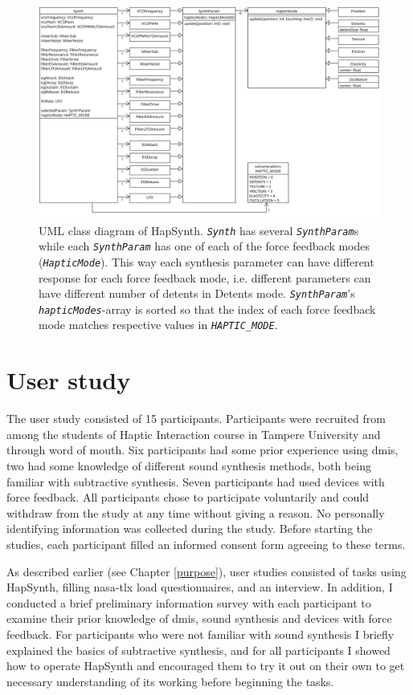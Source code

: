 \begin{figure}[h]
	\centering
	\includegraphics[width=1.0\linewidth]{figures/class-diagram.png}
	\caption{UML class diagram of HapSynth. \emph{\texttt{Synth}} has several \emph{\texttt{SynthParam}}s while each \emph{\texttt{SynthParam}} has one of each of the force feedback modes (\emph{\texttt{HapticMode}}). This way each synthesis parameter can have different response for each force feedback mode, i.e. different parameters can have different number of detents in Detents mode. \emph{\texttt{SynthParam}}'s \emph{\texttt{hapticModes}}-array is sorted so that the index of each force feedback mode matches respective values in \emph{\texttt{HAPTIC\_MODE}}.}
	\label{classdiagram}
\end{figure}

\section{User study} \label{userstudy}

The user study consisted of 15 participants. Participants were recruited from among the students of Haptic Interaction course in Tampere University and through word of mouth. Six participants had some prior experience using \glspl{dmi}, two had some knowledge of different sound synthesis methods, both being familiar with subtractive synthesis. Seven participants had used devices with force feedback. All participants chose to participate voluntarily and could withdraw from the study at any time without giving a reason. No personally identifying information was collected during the study. Before starting the studies, each participant filled an informed consent form agreeing to these terms.

As described earlier (see Chapter \ref{purpose}), user studies consisted of tasks using HapSynth, filling \gls{nasa-tlx} load questionnaires, and an interview. In addition, I conducted a brief preliminary information survey with each participant to examine their prior knowledge of \glspl{dmi}, sound synthesis and devices with force feedback. For participants who were not familiar with sound synthesis I briefly explained the basics of subtractive synthesis, and for all participants I showed how to operate HapSynth and encouraged them to try it out on their own to get necessary understanding of its working before beginning the tasks.

